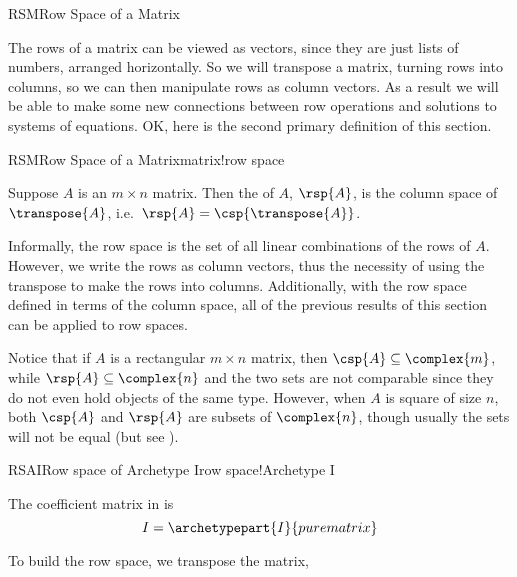 %
\begin{subsect}{RSM}{Row Space of a Matrix}
%
\begin{para}The rows of a matrix can be viewed as vectors, since they are just lists of numbers, arranged horizontally.  So we will transpose a matrix, turning rows into columns, so we can then manipulate rows as column vectors.  As a result we will be able to make some new connections between row operations and solutions to systems of equations.  OK, here is the second primary definition of this section.\end{para}
%
\begin{definition}{RSM}{Row Space of a Matrix}{matrix!row space}
\begin{para}Suppose $A$ is an $m\times n$ matrix.  Then the  of $A$, $\rsp{A}$, is the column space of $\transpose{A}$, i.e.\ $\rsp{A}=\csp{\transpose{A}}$.\end{para}
\end{definition}
%
\begin{para}Informally, the row space is the set of all linear combinations of the rows of $A$.  However, we write the rows as column vectors, thus the necessity of using the transpose to make the rows into columns.   Additionally, with the row space defined in terms of the column space, all of the previous results of this section can be applied to row spaces.\end{para}
%
\begin{para}Notice that if $A$ is a rectangular $m\times n$ matrix, then $\csp{A}\subseteq\complex{m}$, while $\rsp{A}\subseteq\complex{n}$ and the two sets are not comparable since they do not even hold objects of the same type.  However, when $A$ is square of size $n$, both $\csp{A}$ and $\rsp{A}$ are subsets of $\complex{n}$, though usually the sets will not be equal (but see ).\end{para}
%
\begin{example}{RSAI}{Row space of Archetype I}{row space!Archetype I}
%
\begin{para}The coefficient matrix in  is
%
\begin{equation*}
I=\archetypepart{I}{purematrix}\end{equation*}
\end{para}
%
\begin{para}To build the row space, we transpose the matrix,

\end{para}
\end{example}
\end{subsect}
